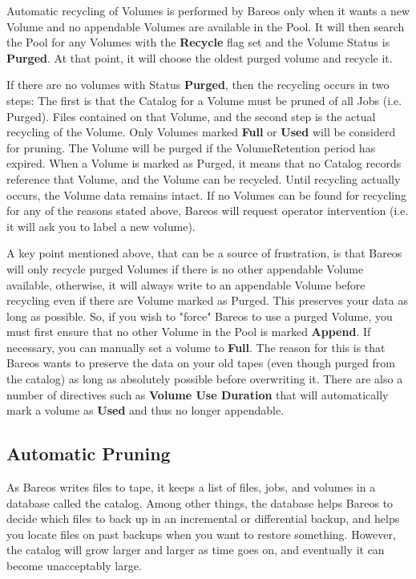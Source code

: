 Automatic recycling of Volumes is performed by Bareos only when it wants a
new Volume and no appendable Volumes are available in the Pool. It will then
search the Pool for any Volumes with the {\bf Recycle} flag set and the
Volume Status is {\bf Purged}. At that point, it will choose the oldest
purged volume and recycle it.

If there are no volumes with Status {\bf Purged}, then
the recycling occurs in two steps:
The first is that the Catalog for a Volume must be pruned of all Jobs (i.e.
Purged).  Files contained on that Volume, and the second step is the actual
recycling of the Volume.  Only Volumes marked {\bf Full} or {\bf Used} will
be considerd for pruning.  The Volume will be purged if the VolumeRetention
period has expired.  When a Volume is marked as Purged, it means that no
Catalog records reference that Volume, and the Volume can be recycled.
Until recycling actually occurs, the Volume data remains intact.  If no
Volumes can be found for recycling for any of the reasons stated above,
Bareos will request operator intervention (i.e.  it will ask you to label a
new volume).

A key point mentioned above, that can be a source of frustration, is that Bareos
will only recycle purged Volumes if there is no other appendable Volume
available, otherwise, it will always write to an appendable Volume before
recycling even if there are Volume marked as Purged. This preserves your data
as long as possible. So, if you wish to "force" Bareos to use a purged
Volume, you must first ensure that no other Volume in the Pool is marked {\bf
Append}. If necessary, you can manually set a volume to {\bf Full}. The reason
for this is that Bareos wants to preserve the data on your old tapes (even
though purged from the catalog) as long as absolutely possible before
overwriting it. There are also a number of directives such as
{\bf Volume Use Duration} that will automatically mark a volume as {\bf
Used} and thus no longer appendable.

\subsection{Automatic Pruning}
\label{AutoPruning}

As Bareos writes files to tape, it keeps a list of files, jobs, and volumes
in a database called the catalog.  Among other things, the database helps
Bareos to decide which files to back up in an incremental or differential
backup, and helps you locate files on past backups when you want to restore
something.  However, the catalog will grow larger and larger as time goes
on, and eventually it can become unacceptably large.

